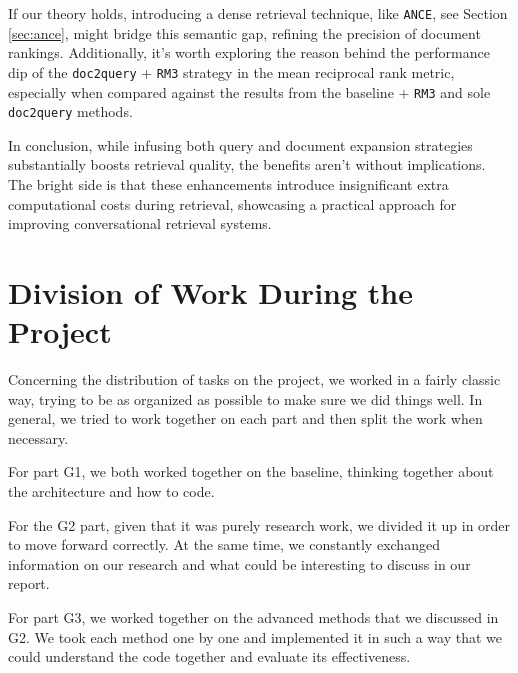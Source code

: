 \documentclass[sigconf]{acmart}
\begin{document}
If our theory holds, introducing a dense retrieval technique, like \texttt{ANCE}, see Section \ref{sec:ance}, might bridge this semantic gap, refining the precision of document rankings. Additionally, it's worth exploring the reason behind the performance dip of the \texttt{doc2query} + \texttt{RM3} strategy in the mean reciprocal rank metric, especially when compared against the results from the baseline + \texttt{RM3} and sole \texttt{doc2query} methods.

In conclusion, while infusing both query and document expansion strategies substantially boosts retrieval quality, the benefits aren't without implications. The bright side is that these enhancements introduce insignificant extra computational costs during retrieval, showcasing a practical approach for improving conversational retrieval systems.








\newpage
\appendix
\section{Division of Work During the Project}
Concerning the distribution of tasks on the project, we worked in a fairly classic way, trying to be as organized as possible to make sure we did things well. In general, we tried to work together on each part and then split the work when necessary.

For part G1, we both worked together on the baseline, thinking together about the architecture and how to code.

For the G2 part, given that it was purely research work, we divided it up in order to move forward correctly. At the same time, we constantly exchanged information on our research and what could be interesting to discuss in our report.

For part G3, we worked together on the advanced methods that we discussed in G2. We took each method one by one and implemented it in such a way that we could understand the code together and evaluate its effectiveness.
\end{document}
